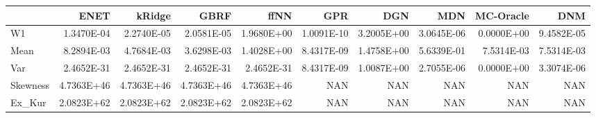 \begin{tabular}{lrrrrrrrrr}
\toprule
{} &       ENET &     kRidge &       GBRF &       ffNN &        GPR &        DGN &        MDN &  MC-Oracle &        DNM \\
\midrule
W1       & 1.3470E-04 & 2.2740E-05 & 2.0581E-05 & 1.9680E+00 & 1.0091E-10 & 3.2005E+00 & 3.0645E-06 & 0.0000E+00 & 9.4582E-05 \\
Mean     & 8.2894E-03 & 4.7684E-03 & 3.6298E-03 & 1.4028E+00 & 8.4317E-09 & 1.4758E+00 & 5.6339E-01 & 7.5314E-03 & 7.5314E-03 \\
Var      & 2.4652E-31 & 2.4652E-31 & 2.4652E-31 & 2.4652E-31 & 8.4317E-09 & 1.0087E+00 & 2.7055E-06 & 0.0000E+00 & 3.3074E-06 \\
Skewness & 4.7363E+46 & 4.7363E+46 & 4.7363E+46 & 4.7363E+46 &        NAN &        NAN &        NAN &        NAN &        NAN \\
Ex\_Kur   & 2.0823E+62 & 2.0823E+62 & 2.0823E+62 & 2.0823E+62 &        NAN &        NAN &        NAN &        NAN &        NAN \\
\bottomrule
\end{tabular}
